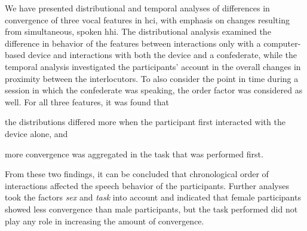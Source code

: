 We have presented distributional and temporal analyses of differences in convergence of three vocal features in \ac{hci}, with emphasis on changes resulting from simultaneous, spoken \ac{hhi}.
The distributional analysis examined the difference in behavior of the features between interactions only with a computer-based device and interactions with both the device and a confederate, while the temporal analysis investigated the participants' account in the overall changes in proximity between the interlocutors.
To also consider the point in time during a session in which the confederate was speaking, the order factor was considered as well.
For all three features, it was found that
\begin{enumerate*}[(a)]
	\item the distributions differed more when the participant first interacted with the device alone, and
	\item more convergence was aggregated in the task that was performed first.
\end{enumerate*}
From these two findings, it can be concluded that chronological order of interactions affected the speech behavior of the participants.
Further analyses took the factors \emph{sex} and \emph{task} into account and indicated that female participants showed less convergence than male participants, but the task performed did not play any role in increasing the amount of convergence.


